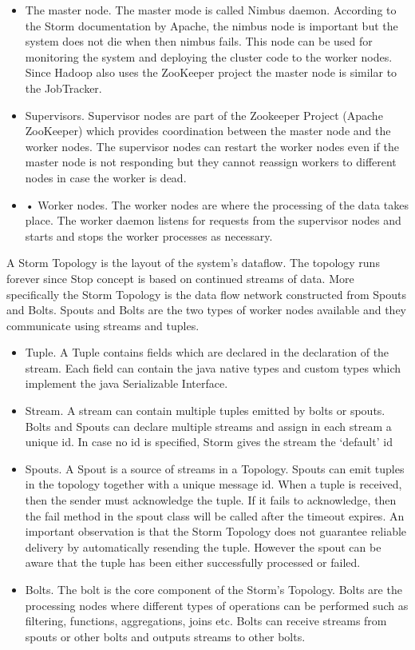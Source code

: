\documentclass{lmproj}
\begin{document}
\begin{itemize}
	\item The master node. The master mode is called Nimbus daemon. According to the Storm documentation by Apache, the nimbus node is important but the system does not die when then nimbus fails. This node can be used for monitoring the system and deploying the cluster code to the worker nodes. Since Hadoop also uses the ZooKeeper project the master node is similar to the JobTracker.
	\item Supervisors. Supervisor nodes are part of the Zookeeper Project (Apache ZooKeeper) which provides coordination between the master node and the worker nodes. The supervisor nodes can restart the worker nodes even if the master node is not responding but they cannot reassign workers to different nodes in case the worker is dead.
	\item •	Worker nodes. The worker nodes are where the processing of the data takes place. The worker daemon listens for requests from the supervisor nodes and starts and stops the worker processes as necessary.
	
\end{itemize}

A Storm Topology is the layout of the system’s dataflow. The topology runs forever since Stop concept is based on continued streams of data.  More specifically the Storm Topology is the data flow network constructed from Spouts and Bolts. Spouts and Bolts are the two types of worker nodes available and they communicate using streams and tuples. 

\begin{itemize}
	\item Tuple. A  Tuple contains fields which are declared in the declaration of the stream. Each field can contain the java native types and custom types which implement the java Serializable Interface.
	\item Stream. A stream can contain multiple tuples emitted by bolts or spouts. Bolts and Spouts can declare multiple streams and assign in each stream a unique id. In case no id is specified, Storm gives the stream the ‘default’  id 
	\item Spouts. A Spout is a source of streams in a Topology. Spouts can emit tuples in the topology together with a unique message id. When a tuple is received, then the sender must acknowledge the tuple. If it fails to acknowledge, then the fail method in the spout class will be called after the timeout expires. An important observation is that the Storm Topology does not guarantee reliable delivery by automatically resending the tuple. However the spout can be aware that the tuple has been either successfully processed or failed.
	\item Bolts. The bolt is the core component of the Storm’s Topology. Bolts are the processing nodes where different types of operations can be performed such as filtering, functions, aggregations, joins etc. Bolts can receive streams from spouts or other bolts and outputs streams to other bolts.
\end{itemize}
\end{document}
